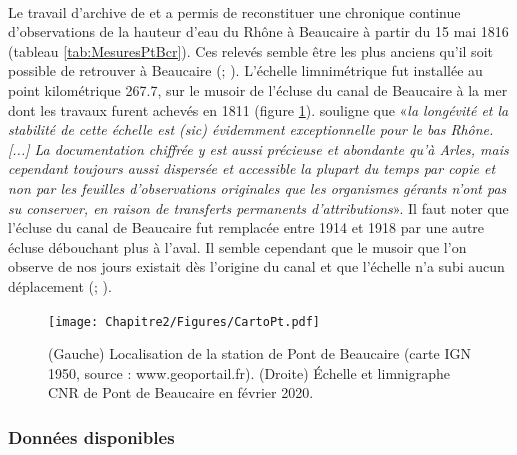 	\paragraph{} Le travail d'archive de \citet{pichard_les_1995} et \citet{pichard_hydro-climatology_2017} a permis de reconstituer une chronique continue d'observations de la hauteur d'eau du Rhône à Beaucaire à partir du 15 mai 1816 (tableau \ref{tab:MesuresPtBcr}). Ces relevés semble être les plus anciens qu'il soit possible de retrouver à Beaucaire (\cite{parde_regime_1925}; \cite{pichard_les_1995}). L'échelle limnimétrique fut installée au point kilométrique 267.7, sur le musoir de l'écluse du canal de Beaucaire à la mer dont les travaux furent achevés en 1811 (figure \ref{fig:CartoPt}). \citet{pichard_hauteurs_2013} souligne que «\textit{la longévité et la stabilité de cette échelle est (sic) évidemment exceptionnelle pour le bas Rhône. [...] La documentation chiffrée y est aussi précieuse et abondante qu'à Arles, mais cependant toujours aussi dispersée et accessible la plupart du temps par copie et non par les feuilles d'observations originales que les organismes gérants n'ont pas su conserver, en raison de transferts permanents d'attributions}». Il faut noter que l'écluse du canal de Beaucaire fut remplacée entre 1914 et 1918 par une autre écluse débouchant plus à l'aval. Il semble cependant que le musoir que l'on observe de nos jours existait dès l'origine du canal et que l'échelle n'a subi aucun déplacement (\cite{pichard_hauteurs_2013}; \cite{bard_actualisation_2018}). 
	
	\begin{figure}[h]
	\centering
		\texttt{[image: Chapitre2/Figures/CartoPt.pdf]}
        \caption{(Gauche) Localisation de la station de Pont de Beaucaire (carte IGN 1950, source : www.geoportail.fr). (Droite) Échelle et limnigraphe CNR de Pont de Beaucaire en février 2020.}	
		\label{fig:CartoPt}
	\end{figure}

\FloatBarrier

	\subsubsection{Données disponibles}
